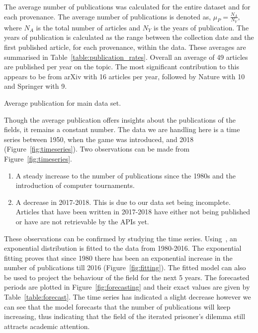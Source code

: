 \documentclass{article}
\theoremstyle{definition}
\begin{document}
The average number of publications was calculated for the entire dataset and for
each provenance. The average number of publications is denoted as,
\(\mu_P = \frac{N_A}{N_Y},\) where \(N_A\) is the total number of articles and
\(N_Y\) is the years of publication. The years of publication is calculated as
the range between the collection date and the first published article, for each provenance,
within the data.
These averages are summarised in Table~\ref{table:publication_rates}.
Overall an average of 49 articles are published per year on the topic. The most
significant contribution to this appears to be from arXiv with 16 articles per year,
followed by Nature with 10 and Springer with 9.

\begin{table}[!hbtp]
    \begin{center}
    
    \end{center}
    \caption{Average publication for main data set.} %
    \label{table:publication_rates}
\end{table}

Though the average publication offers insights about the publications of the
fields, it remains a constant number. The data we are handling here is a time
series between 1950, when the game was introduced, and 2018 (Figure~\ref{fig:timeseries}). 
Two observations can be made from Figure~\ref{fig:timeseries}.

\begin{enumerate}
    \item A steady increase to the number of publications since the 1980s
    and the introduction of computer tournaments.
    \item A decrease in 2017-2018. This is due to our data set being incomplete.
    Articles that have been written in 2017-2018 have either not being published
    or have are not retrievable by the APIs yet.
\end{enumerate}

These observations can be confirmed by studying the time series.
Using~\cite{scipy}, an exponential distribution is fitted to
the data from 1980-2016. The exponential fitting proves that since 1980 there has
been an exponential increase in the number of publications till 2016 (Figure~\ref{fig:fitting}).
The fitted model can also be used to project the behaviour of the field for the next 
5 years. The forecasted periods are plotted in Figure~\ref{fig:forecasting} and
their exact values are given by Table~\ref{table:forecast}. The time series
has indicated a slight decrease however we can see that the model forecasts that the number
of publications will keep increasing, thus indicating that the field of the iterated
prisoner's dilemma still attracts academic attention.
\end{document}

